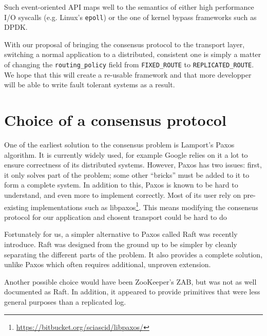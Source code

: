 Such event-oriented API maps well to the semantics of either high performance I/O syscalls (e.g. Linux's \texttt{epoll}) or the one of kernel bypass frameworks such as DPDK.

\begin{lstfloat}

\end{lstfloat}

\begin{lstfloat}

\end{lstfloat}

With our proposal of bringing the consensus protocol to the transport layer, switching a normal application to a distributed, consistent one is simply a matter of changing the \texttt{routing\_policy} field from \texttt{FIXED\_ROUTE} to \texttt{REPLICATED\_ROUTE}.
We hope that this will create a re-usable framework and that more developper will be able to write fault tolerant systems as a result.

\section{Choice of a consensus protocol}

One of the earliest solution to the consensus problem is Lamport's Paxos algorithm\cite{paxos}.
It is currently widely used, for example Google relies on it a lot to ensure correctness of its distributed systems\cite{chubby, paxoslive}.
However, Paxos has two issues: first, it only solves part of the problem; some other ``bricks'' must be added to it to form a complete system.
In addition to this, Paxos is known to be hard to understand, and even more to implement correctly.
Most of its user rely on pre-existing implementations such as libpaxos\footnote{\url{https://bitbucket.org/sciascid/libpaxos/}}.
This means modifying the consensus protocol for our application and chosent transport could be hard to do

Fortunately for us, a simpler alternative to Paxos called Raft was recently introduce\cite{raft}.
Raft was designed from the ground up to be simpler by cleanly separating the different parts of the problem.
It also provides a complete solution, unlike Paxos which often requires additional, unproven extension\cite{paxoslive}.

Another possible choice would have been ZooKeeper's ZAB\cite{zookeeper}, but was not as well documented as Raft.
In addition, it appeared to provide primitives that were less general purposes than a replicated log.

